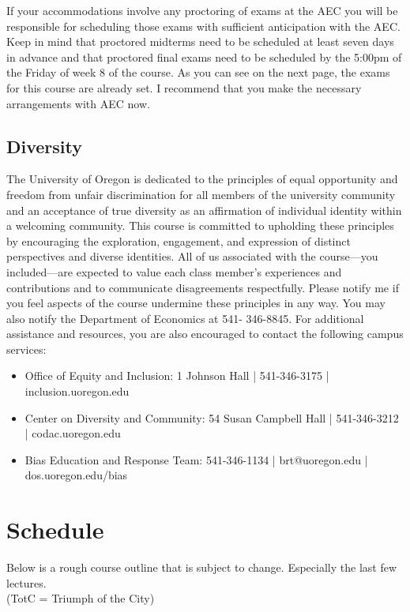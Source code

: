 \documentclass[11pt]{article}
\begin{document}
\noindent	If your accommodations involve any proctoring of exams at the AEC you will be responsible for scheduling those exams with sufficient anticipation with the AEC. Keep in mind that proctored midterms need to be scheduled at least seven days in advance and that proctored final exams need to be scheduled by the 5:00pm of the Friday of week 8 of the course. As you can see on the next page, the exams for this course are already set. I recommend that you make the necessary arrangements with AEC now.
	
	\subsection*{Diversity}
	
	The University of Oregon is dedicated to the principles of equal opportunity and freedom from unfair discrimination for all members of the university community and an acceptance of true diversity as an affirmation of individual identity within a welcoming community. This course is committed to upholding these principles by encouraging the exploration, engagement, and expression of distinct perspectives and diverse identities.
	All of us associated with the course—you included—are expected to value each class member’s experiences and contributions and to communicate disagreements respectfully. Please notify me if you feel aspects of the course undermine these principles in any way. You may also notify the Department of Economics at 541- 346-8845. For additional assistance and resources, you are also encouraged to contact the following campus services:
	\begin{itemize}
		\item Office of Equity and Inclusion: 1 Johnson Hall | 541-346-3175 | inclusion.uoregon.edu
		\item Center on Diversity and Community: 54 Susan Campbell Hall | 541-346-3212 | codac.uoregon.edu
		\item Bias Education and Response Team: 541-346-1134 | brt@uoregon.edu | dos.uoregon.edu/bias
		
	\end{itemize}
	
	\newpage
	\section*{Schedule}
	
	Below is a rough course outline that is subject to change. Especially the last few lectures.\\ (TotC = Triumph of the City)
	
\end{document}
